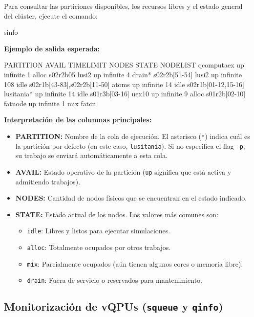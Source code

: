 \documentclass[a4paper,11pt]{article}
\begin{document}
Para consultar las particiones disponibles, los recursos libres y el estado general del clúster, ejecute el comando:

\begin{terminal}
sinfo
\end{terminal}

\textbf{Ejemplo de salida esperada:}
\begin{terminal}[listing options={columns=fixed, basicstyle=\color{gray!80}\ttfamily\small, literate={}}]
PARTITION   AVAIL  TIMELIMIT  NODES  STATE NODELIST
qcomputaex     up   infinite      1  alloc s02r2b05
lusi2          up   infinite      4 drain* s02r2b[51-54]
lusi2          up   infinite    108   idle s02r1b[43-83],s02r2b[11-50]
atoms          up   infinite     14   idle s02r1b[01-12,15-16]
lusitania* up   infinite     14   idle s01r3b[03-16]
uex10          up   infinite      9  alloc s01r2b[02-10]
fatnode        up   infinite      1    mix fatcn
\end{terminal}

\vspace{0.3cm}
\textbf{Interpretación de las columnas principales:}
\begin{itemize}
    \item \textbf{PARTITION:} Nombre de la cola de ejecución. El asterisco (\texttt{*}) indica cuál es la partición por defecto (en este caso, \texttt{lusitania}). Si no especifica el flag \texttt{-p}, su trabajo se enviará automáticamente a esta cola.
    \item \textbf{AVAIL:} Estado operativo de la partición (\texttt{up} significa que está activa y admitiendo trabajos).
    \item \textbf{NODES:} Cantidad de nodos físicos que se encuentran en el estado indicado.
    \item \textbf{STATE:} Estado actual de los nodos. Los valores más comunes son:
    \begin{itemize}
        \item \texttt{idle}: Libres y listos para ejecutar simulaciones.
        \item \texttt{alloc}: Totalmente ocupados por otros trabajos.
        \item \texttt{mix}: Parcialmente ocupados (aún tienen algunos cores o memoria libre).
        \item \texttt{drain}: Fuera de servicio o reservados para mantenimiento.
    \end{itemize}
\end{itemize}
\subsection{Monitorización de vQPUs (\texttt{squeue} y \texttt{qinfo})}
\end{document}
